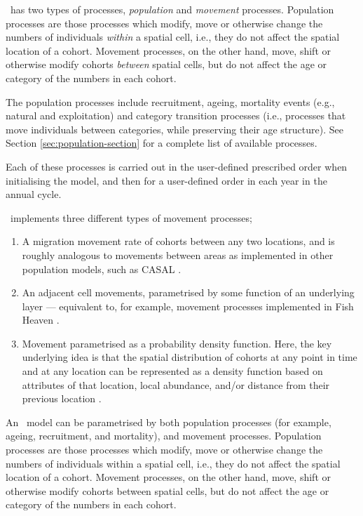 \SPM\ has two types of processes, \emph{population} and \emph{movement} processes. Population processes are those processes which modify, move or otherwise change the numbers of individuals \emph{within} a spatial cell, i.e., they do not affect the spatial location of a cohort. Movement processes, on the other hand, move, shift or otherwise modify cohorts \emph{between} spatial cells, but do not affect the age or category of the numbers in each cohort. 

The population processes include recruitment, ageing,  mortality events (e.g., natural and exploitation) and category transition processes (i.e., processes that move individuals between categories, while preserving their age structure). See Section \ref{sec:population-section} for a complete list of available processes.

Each of these processes is carried out in the user-defined prescribed order when initialising the model, and then for a user-defined order in each year in the annual cycle.

\SPM\ implements three different types of movement processes;
\begin{enumerate}
	\item  A migration movement rate of cohorts between any two locations, and is roughly analogous to movements between areas as implemented in other population models, such as CASAL \citep{1388}. 
	\item An adjacent cell movements, parametrised by some function of an underlying layer --- equivalent to, for example, movement processes implemented in Fish Heaven \citep{1136,1135}. 
	\item Movement parametrised as a probability density function. Here, the key underlying idea is that the spatial distribution of cohorts at any point in time and at any location can be represented as a density function based on attributes of that location, local abundance, and/or distance from their previous location \citep{1366,1367}. 
\end{enumerate}

An \SPM\ model can be parametrised by both population processes (for example, ageing, recruitment, and mortality), and movement processes. Population processes are those processes which modify, move or otherwise change the numbers of individuals within a spatial cell, i.e., they do not affect the spatial location of a cohort. Movement processes, on the other hand, move, shift or otherwise modify cohorts between spatial cells, but do not affect the age or category of the numbers in each cohort. 

